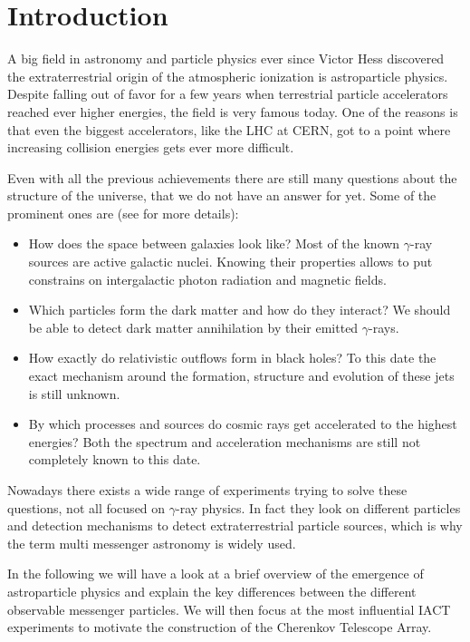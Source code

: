 \chapter{Introduction}
A big field in astronomy and particle physics ever since Victor Hess discovered
the extraterrestrial origin of the atmospheric ionization
is astroparticle physics. Despite falling out of favor for a few years
when terrestrial particle accelerators reached ever higher energies,
the field is very famous today. One of the reasons is that
even the biggest accelerators, like the LHC at CERN, got to a point where
increasing collision energies gets ever more difficult.

Even with all the previous achievements
there are still many questions about the structure of the universe, that we do not have an 
answer for yet.
Some of the prominent ones are (see \cite{funcray} for more details):
\begin{itemize}
    \item{How does the space between galaxies look like? 
		Most of the known $\gamma$-ray sources are active galactic nuclei. 
		Knowing their properties allows to put constrains on
		intergalactic photon radiation and magnetic fields.}
    \item{Which particles form the dark matter and how do they interact? 
		We should be able to detect dark matter annihilation by their emitted $\gamma$-rays.}
    \item{How exactly do relativistic outflows form in black holes?
		To this date the exact mechanism around the formation, structure and evolution of these
		jets is still unknown.}
    \item{By which processes and sources do cosmic rays get accelerated to the highest energies?
		Both the spectrum and acceleration mechanisms are still not completely known to this date.}
\end{itemize}

Nowadays there exists a wide range of experiments trying to
solve these questions, not all focused on 
$\gamma$-ray physics.
In fact they look on different particles and detection
mechanisms to detect
extraterrestrial particle sources, which is why
the term multi messenger astronomy is widely used.

In the following we will have a look at a brief overview 
of the emergence
of astroparticle physics and explain the key differences between 
the different observable messenger particles.
We will then focus at the 
most influential IACT experiments to motivate the construction of 
the Cherenkov Telescope Array.

